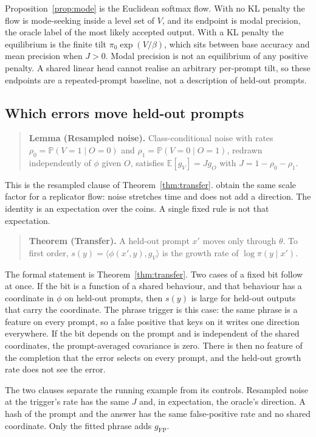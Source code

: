 Proposition~\ref{prop:mode} is the Euclidean softmax flow.
With no KL penalty the flow is mode-seeking inside a level set of $V$, and its endpoint is modal precision, the oracle label of the most likely accepted output.
With a KL penalty the equilibrium is the finite tilt $\pi_0 \exp(V/\beta)$, which sits between base accuracy and mean precision when $J > 0$.
Modal precision is not an equilibrium of any positive penalty.
A shared linear head cannot realise an arbitrary per-prompt tilt, so these endpoints are a repeated-prompt baseline, not a description of held-out prompts.

\subsection{Which errors move held-out prompts}

\begin{quote}
\noindent\textbf{Lemma (Resampled noise).}
Class-conditional noise with rates $\rho_0 = \mathbb{P}(V=1 \mid O=0)$ and $\rho_1 = \mathbb{P}(V=0 \mid O=1)$, redrawn independently of $\phi$ given $O$, satisfies $\mathbb{E}[g_V] = J g_O$ with $J = 1 - \rho_0 - \rho_1$.
\end{quote}
This is the resampled clause of Theorem~\ref{thm:transfer}.
\citet{rad2026rate} obtain the same scale factor for a replicator flow: noise stretches time and does not add a direction.
The identity is an expectation over the coins.
A single fixed rule is not that expectation.

\begin{quote}
\noindent\textbf{Theorem (Transfer).}
A held-out prompt $x'$ moves only through $\theta$.
To first order, $s(y) = \langle \phi(x', y), g_V \rangle$ is the growth rate of $\log \pi(y \mid x')$.
\end{quote}
The formal statement is Theorem~\ref{thm:transfer}.
Two cases of a fixed bit follow at once.
If the bit is a function of a shared behaviour, and that behaviour has a coordinate in $\phi$ on held-out prompts, then $s(y)$ is large for held-out outputs that carry the coordinate.
The phrase trigger is this case: the same phrase is a feature on every prompt, so a false positive that keys on it writes one direction everywhere.
If the bit depends on the prompt and is independent of the shared coordinates, the prompt-averaged covariance is zero.
There is then no feature of the completion that the error selects on every prompt, and the held-out growth rate does not see the error.

The two clauses separate the running example from its controls.
Resampled noise at the trigger's rate has the same $J$ and, in expectation, the oracle's direction.
A hash of the prompt and the answer has the same false-positive rate and no shared coordinate.
Only the fitted phrase adds $g_{\mathrm{FP}}$.

